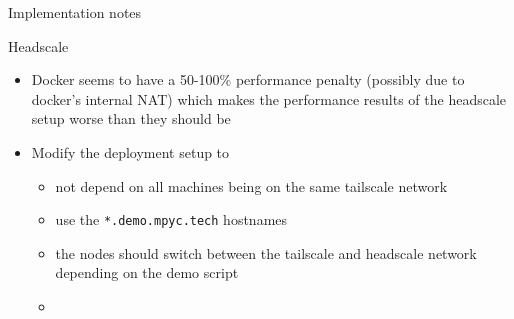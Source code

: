 \hypertarget{notes__03000-implementations.md}{}
\begin{frame}[fragile]{Implementation notes}
\protect\hypertarget{notes__03000-implementations.md__implementation-notes}{}
\begin{block}{Headscale}
\protect\hypertarget{notes__03000-implementations.md__headscale}{}
\begin{itemize}
\tightlist
\item
  Docker seems to have a 50-100\% performance penalty (possibly due to
  docker's internal NAT) which makes the performance results of the
  headscale setup worse than they should be
\item
  Modify the deployment setup to

  \begin{itemize}
  \tightlist
  \item
    not depend on all machines being on the same tailscale network
  \item
    use the \texttt{*.demo.mpyc.tech} hostnames
  \item
    the nodes should switch between the tailscale and headscale network
    depending on the demo script
  \item
  \end{itemize}
\end{itemize}
\end{block}
\end{frame}


